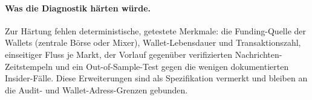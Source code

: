 \paragraph{Was die Diagnostik härten würde.}
Zur Härtung fehlen deterministische, getestete Merkmale: die Funding-Quelle der
Wallets (zentrale Börse oder Mixer), Wallet-Lebensdauer und Transaktionszahl,
einseitiger Fluss je Markt, der Vorlauf gegenüber verifizierten
Nachrichten-Zeitstempeln und ein Out-of-Sample-Test gegen die wenigen
dokumentierten Insider-Fälle. Diese Erweiterungen sind als Spezifikation
vermerkt und bleiben an die Audit- und Wallet-Adress-Grenzen gebunden.
